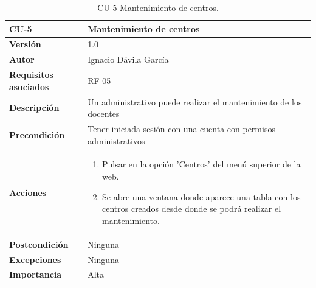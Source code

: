 \begin{table}[p]
	\centering
	\begin{tabularx}{\linewidth}{ p{} p{} }
		\toprule
		\textbf{CU-5}    & \textbf{Mantenimiento de centros}\\
		\toprule
		\textbf{Versión}              & 1.0    \\
		\textbf{Autor}                & Ignacio Dávila García \\
		\textbf{Requisitos asociados} & RF-05 \\
		\textbf{Descripción}          & Un administrativo puede realizar el mantenimiento de los docentes \\
		\textbf{Precondición}         & Tener iniciada sesión con una cuenta con permisos administrativos \\
		\textbf{Acciones}             &
		\begin{enumerate}
			\def\labelenumi{\arabic{enumi}.}
			\tightlist
			\item Pulsar en la opción 'Centros' del menú superior de la web.
			\item Se abre una ventana donde aparece una tabla con los centros creados desde donde se podrá realizar el mantenimiento.
		\end{enumerate}\\
		\textbf{Postcondición}        & Ninguna \\
		\textbf{Excepciones}          & Ninguna \\
		\textbf{Importancia}          & Alta \\
		\bottomrule
	\end{tabularx}
	\caption{CU-5 Mantenimiento de centros.}
\end{table}

